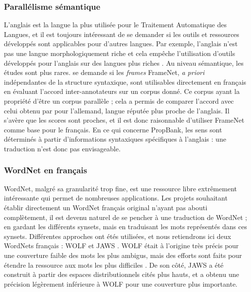 \subsubsection{Parallélisme sémantique}

L'anglais est la langue la plus utilisée pour le Traitement Automatique des
Langues, et il est toujours intéressant de se demander si les outils et
ressources développés sont applicables pour d'autres langues. Par exemple,
l'anglais n'est pas une langue morphologiquement riche et cela empêche
l'utilisation d'outils développés pour l'anglais sur des langues plus riches
\citep{tsarfaty2010statistical}. Au niveau sémantique, les études sont plus
rares. \cite{pado2007annotation} se demande si les \textit{frames} FrameNet,
\textit{a priori} indépendantes de la structure syntaxique, sont utilisables
directement en français en évaluant l'accord inter-annotateurs sur un corpus
donné. Ce corpus ayant la propriété d'être un corpus parallèle ; cela a permis
de comparer l'accord avec celui obtenu par \cite{pado2006optimal} pour
l'allemand, langue réputée plus proche de l'anglais. Il s'avère que les scores
sont proches, et il est donc raisonnable d'utiliser FrameNet comme base pour le
français. En ce qui concerne PropBank, les sens sont déterminés à partir
d'informations syntaxiques spécifiques à l'anglais : une traduction n'est donc
pas envisageable.

\subsubsection{WordNet en français}

WordNet, malgré sa granularité trop fine, est une ressource libre extrêmement
intéressante qui permet de nombreuses applications. Les projets souhaitant
établir directement un WordNet français original n'ayant pas abouti
complètement, il est devenu naturel de se pencher à une traduction de WordNet ;
en gardant les différents synsets, mais en traduisant les mots représentés dans
ces synsets. Différentes approches ont étés utilisées, et nous retiendrons ici
deux WordNets français : WOLF \cite{sagot2008construction} et JAWS
\cite{mouton2010jaws}. WOLF était à l'origine très précis pour une couverture
faible des mots les plus ambigus, mais des efforts sont faits pour étendre la
ressource aux mots les plus difficiles \citep{sagot2012automatic}. De son côté,
JAWS a été construit à partir des espaces distributionnels cités plus hauts, et
a obtenu une précision légèrement inférieure à WOLF pour une couverture plus
importante.

